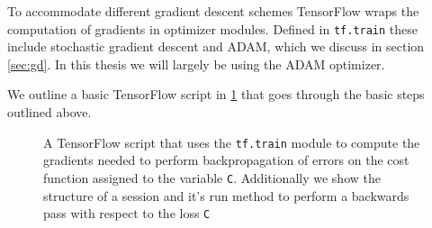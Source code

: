 To accommodate different gradient descent schemes TensorFlow wraps the computation of gradients in optimizer modules. Defined in \lstinline{tf.train} these include stochastic gradient descent and ADAM, which we discuss in section \ref{sec:gd}. In this thesis we will largely be using the ADAM optimizer.

We outline a basic TensorFlow script in \ref{code:tf_script} that goes through the basic steps outlined above.

\begin{figure}
\centering 
\begin{minipage}[c]{\linewidth}

\end{minipage}
\caption[Computing gradients and performing back-propagation in TensorFlow]{A TensorFlow script that uses the \lstinline{tf.train} module to compute the gradients needed to perform backpropagation of errors on the cost function assigned to the variable \lstinline{C}. Additionally we show the structure of a session and it's run method to perform a backwards pass with respect to the loss \lstinline{C}}\label{code:tf_script}
\end{figure}

